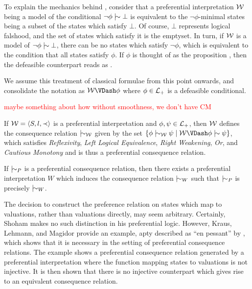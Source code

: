 To explain the mechanics behind , consider that a preferential interpretation $\mathcal{W}$
being a model of the conditional $\neg \phi \twiddle \bot$ is equivalent to the $\neg \phi$-minimal states being a subset
of the states which satisfy $\bot$. Of course, $\bot$ represents logical falshood, and the set of states which satisfy
it is the emptyset. In turn, if $\mathcal{W}$ is a model of $\neg \phi \twiddle \bot$, there can be no states which satisfy $\neg
\phi$, which is equivalent to the condition that all states satisfy $\phi$. If $\phi$ is thought of as the proposition ,
then the defeasible counterpart reads as 
\cite{kraus1990nonmonotonic,lehmann1992what}.

We assume this treatment of classical formulae from this point onwards, and consolidate the notation as $\pin \VDash \phi$
where $\phi \in \mathcal{L}_+$ is a defeasible conditional.

\textcolor{red}{maybe something about how without smoothness, we don't have CM}

\begin{theorem}[Soundness]
	\label{theorem:soundness-preferential}

	If $\mathcal{W} = \langle S,l,\prec \rangle$ is a preferential interpretation and $\phi, \psi \in \mathcal{L}_+$, then $\mathcal{W}$ defines the consequence relation $\twiddle
	_{\pin}$ given by the set $\{\phi \twiddle_{\pin}\psi \mid \pin \VDash \phi \twiddle \psi\}$, which satisfies \textit{Reflexivity},
	\textit{Left Logical Equivalence}, \textit{Right Weakening}, \textit{Or}, and \textit{Cautious Monotony} and is thus a
	preferential consequence relation.
\end{theorem}

\begin{theorem}[Completeness]
	\label{theorem:completeness-preferential}

	If $\twiddle_{P}$ is a preferential consequence relation, then there exists a preferential interpretation $W$ which induces
	the consequence relation $\twiddle_{W}$ such that $\twiddle_{P}$ is precisely $\twiddle_{W}$.
\end{theorem}

The decision to construct the preference relation on states which map to valuations, rather than valuations directly, may
seem arbitrary. Certainly, Shoham \cite{shohamSemanticApproach} makes no such distinction in his preferential logic.
However, Kraus, Lehmann, and Magidor \cite{kraus1990nonmonotonic} provide an example, apty described as ``en pessant''
by \cite{Bezzazi1997}, which shows that it is necessary in the setting of preferential consequence relations. The
example shows a preferential consequence relation generated by a preferential interpretation where the function mapping
states to valuations is not injective. It is then shown that there is no injective counterpart which gives rise to an equivalent
consequence relation.

